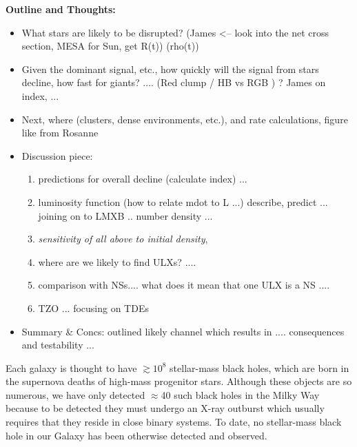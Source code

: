 \bf{Outline and Thoughts:}\\
\begin{itemize}
\item What stars are likely to be disrupted?  (James <-- look into the net cross section, MESA for Sun, get R(t)) (rho(t)) \\
\item Given the dominant signal, etc., how quickly will the signal from stars decline, how fast for giants? .... (Red clump / HB vs RGB ) ?  James on index, ... \\ 
\item Next, where (clusters, dense environments, etc.), and rate calculations, figure like from Rosanne \\
\item Discussion piece: 
\begin{enumerate}
    \item predictions for overall decline (calculate index) ... 
    \item luminosity function (how to relate mdot to L ...) describe, predict  ... joining on to LMXB .. number density ... 
    \item {\it sensitivity of all above to initial density},  
    \item where are we likely to find ULXs? .... 
    \item comparison with NSs.... what does it mean that one ULX is a NS .... 
    \item TZO ... focusing on TDEs 
    \end{enumerate}
    
\item Summary \& Concs: outlined likely channel which results in .... consequences and testability ... 
\end{itemize}






Each galaxy is thought to have $\gtrsim 10^8$ stellar-mass black
holes, which are born in the supernova deaths of high-mass progenitor
stars.  Although these objects are so numerous, we have only detected
$\approx$40 such black holes in the Milky Way because to be detected
they must undergo an X-ray outburst which usually requires that they
reside in close binary systems.  To date, no stellar-mass black hole
in our Galaxy has been otherwise detected and observed.


